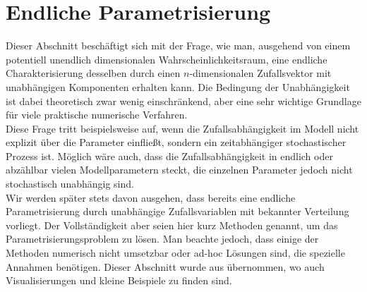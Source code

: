 \section{Endliche Parametrisierung}
\label{secfiniteparam}
Dieser Abschnitt beschäftigt sich mit der Frage, wie man, ausgehend von einem potentiell unendlich dimensionalen Wahrscheinlichkeitsraum, eine endliche Charakterisierung desselben durch einen $n$-dimensionalen Zufallsvektor mit unabhängigen Komponenten erhalten kann. Die Bedingung der Unabhängigkeit ist dabei theoretisch zwar wenig einschränkend, aber eine sehr wichtige Grundlage für viele praktische numerische Verfahren.\\
Diese Frage tritt beispielsweise auf, wenn die Zufallsabhängigkeit im Modell nicht explizit über die Parameter einfließt, sondern ein zeitabhängiger stochastischer Prozess ist. Möglich wäre auch, dass die Zufallsabhängigkeit in endlich oder abzählbar vielen Modellparametern steckt, die einzelnen Parameter jedoch nicht stochastisch unabhängig sind.\\
Wir werden später stets davon ausgehen, dass bereits eine endliche Parametrisierung durch unabhängige Zufallsvariablen mit bekannter Verteilung vorliegt. Der Vollständigkeit aber seien hier kurz Methoden genannt, um das Parametrisierungsproblem zu lösen. Man beachte jedoch, dass einige der Methoden numerisch nicht umsetzbar oder ad-hoc Lösungen sind, die spezielle Annahmen benötigen. Dieser Abschnitt wurde aus \autocite[Kapitel 4.1+4.2]{dongbinxiu2010} übernommen, wo auch Visualisierungen und kleine Beispiele zu finden sind.

